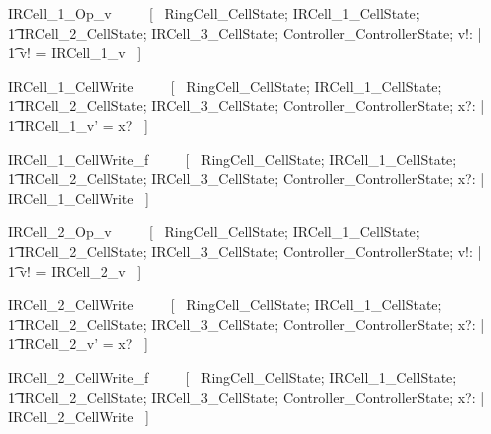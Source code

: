 \documentclass{article}
\begin{document}
\begin{zed}
IRCell\_1\_Op\_v ~~~~ [~ 
    \Xi RingCell\_CellState; 
    \Xi IRCell\_1\_CellState; \\
    \t1 \Xi IRCell\_2\_CellState; 
    \Xi IRCell\_3\_CellState;
    \Xi Controller\_ControllerState; v!: \nat | \\
    \t1 v! = IRCell\_1\_v ~] \\
\end{zed}

\begin{zed}
IRCell\_1\_CellWrite ~~~~ [~ 
    \Xi RingCell\_CellState; 
    \Delta IRCell\_1\_CellState; \\
    \t1 \Xi IRCell\_2\_CellState; 
    \Xi IRCell\_3\_CellState;
    \Xi Controller\_ControllerState; 
    x?: \nat | \\
    \t1 IRCell\_1\_v' = x? ~] \\
\end{zed}

\begin{zed}
IRCell\_1\_CellWrite\_f ~~~~ [~ 
    \Xi RingCell\_CellState; 
    \Xi IRCell\_1\_CellState; \\
    \t1 \Xi IRCell\_2\_CellState; 
    \Xi IRCell\_3\_CellState;
    \Xi Controller\_ControllerState; 
    x?: \nat | \\
    \lnot \pre IRCell\_1\_CellWrite ~] \\
\end{zed}

\begin{zed}
IRCell\_2\_Op\_v ~~~~ [~ 
    \Xi RingCell\_CellState; 
    \Xi IRCell\_1\_CellState; \\
    \t1 \Xi IRCell\_2\_CellState; 
    \Xi IRCell\_3\_CellState;
    \Xi Controller\_ControllerState; v!: \nat | \\
    \t1 v! = IRCell\_2\_v ~] \\
\end{zed}

\begin{zed}
IRCell\_2\_CellWrite ~~~~ [~ 
    \Xi RingCell\_CellState; 
    \Xi IRCell\_1\_CellState; \\
    \t1 \Delta IRCell\_2\_CellState; 
    \Xi IRCell\_3\_CellState;
    \Xi Controller\_ControllerState; 
    x?: \nat | \\
    \t1 IRCell\_2\_v' = x? ~] \\
\end{zed}

\begin{zed}
IRCell\_2\_CellWrite\_f ~~~~ [~ 
    \Xi RingCell\_CellState; 
    \Xi IRCell\_1\_CellState; \\
    \t1 \Xi IRCell\_2\_CellState; 
    \Xi IRCell\_3\_CellState;
    \Xi Controller\_ControllerState; 
    x?: \nat | \\
    \lnot \pre IRCell\_2\_CellWrite ~] \\
\end{zed}
\end{document}
